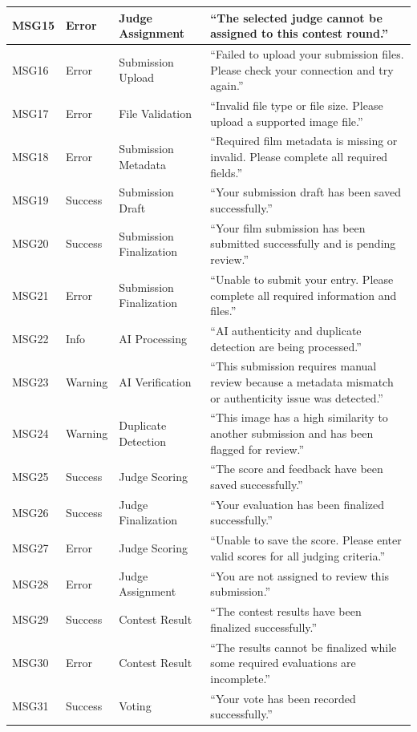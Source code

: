 \begin{longtable}{|>{\centering\arraybackslash}p{}|>{\centering\arraybackslash}p{}|>{\raggedright\arraybackslash}p{}|>{\raggedright\arraybackslash}p{}|}
\hline
MSG15 & Error & Judge Assignment & ``The selected judge cannot be assigned to this contest round.'' \\
\hline
MSG16 & Error & Submission Upload & ``Failed to upload your submission files. Please check your connection and try again.'' \\
\hline
MSG17 & Error & File Validation & ``Invalid file type or file size. Please upload a supported image file.'' \\
\hline
MSG18 & Error & Submission Metadata & ``Required film metadata is missing or invalid. Please complete all required fields.'' \\
\hline
MSG19 & Success & Submission Draft & ``Your submission draft has been saved successfully.'' \\
\hline
MSG20 & Success & Submission Finalization & ``Your film submission has been submitted successfully and is pending review.'' \\
\hline
MSG21 & Error & Submission Finalization & ``Unable to submit your entry. Please complete all required information and files.'' \\
\hline
MSG22 & Info & AI Processing & ``AI authenticity and duplicate detection are being processed.'' \\
\hline
MSG23 & Warning & AI Verification & ``This submission requires manual review because a metadata mismatch or authenticity issue was detected.'' \\
\hline
MSG24 & Warning & Duplicate Detection & ``This image has a high similarity to another submission and has been flagged for review.'' \\
\hline
MSG25 & Success & Judge Scoring & ``The score and feedback have been saved successfully.'' \\
\hline
MSG26 & Success & Judge Finalization & ``Your evaluation has been finalized successfully.'' \\
\hline
MSG27 & Error & Judge Scoring & ``Unable to save the score. Please enter valid scores for all judging criteria.'' \\
\hline
MSG28 & Error & Judge Assignment & ``You are not assigned to review this submission.'' \\
\hline
MSG29 & Success & Contest Result & ``The contest results have been finalized successfully.'' \\
\hline
MSG30 & Error & Contest Result & ``The results cannot be finalized while some required evaluations are incomplete.'' \\
\hline
MSG31 & Success & Voting & ``Your vote has been recorded successfully.'' \\

\end{longtable}
